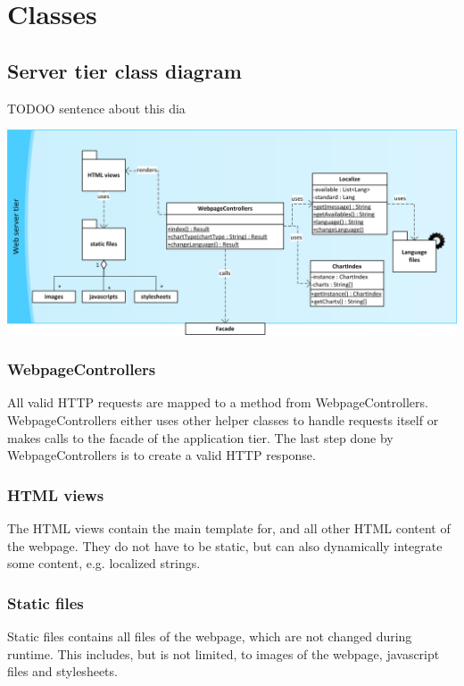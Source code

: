 \section{Classes}



\subsection{Server tier class diagram}
TODOO sentence about this dia
\begin{center}
\includegraphics[width=1\linewidth]{Pictures/ServerTierDia.png}
\end{center}   


\subsubsection*{WebpageControllers}
All valid HTTP requests are mapped to a method from WebpageControllers.
WebpageControllers either uses other helper classes to handle requests itself  
or makes calls to the facade of the application tier. 
The last step done by WebpageControllers is to create a valid HTTP response.
                                                                            

\subsubsection*{HTML views}
The HTML views contain the main template for, and all other HTML content of the webpage. %
They do not have to be static, but can also dynamically integrate some content, e.g. localized strings.

\subsubsection*{Static files}
Static files contains all files of the webpage, which are not changed during runtime. 
This includes, but is not limited, to images of the webpage, javascript files and stylesheets.

